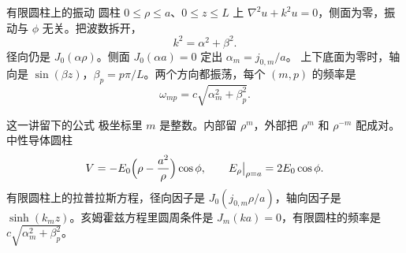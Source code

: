 \documentclass[fontset=windows, chinese, 10pt, xcolor=dvipsnames]{beamer}
\begin{document}
\begin{frame}{有限圆柱上的振动}
  圆柱 $0\leq\rho\leq a$、$0\leq z\leq L$ 上 $\nabla^2 u+k^2 u=0$，侧面为零，振动与 $\phi$ 无关。把波数拆开，
  \[
    k^2=\alpha^2+\beta^2.
  \]
  径向仍是 $J_0(\alpha\rho)$。侧面 $J_0(\alpha a)=0$ 定出 $\alpha_m=j_{0,m}/a$。
  \vspace{0.35em}
  上下底面为零时，轴向是 $\sin(\beta z)$，$\beta_p=p\pi/L$。两个方向都振荡，每个 $(m,p)$ 的频率是
  \[
    \omega_{mp}=c\sqrt{\alpha_m^2+\beta_p^2}.
  \]
\end{frame}

\begin{frame}{这一讲留下的公式}
  极坐标里 $m$ 是整数。内部留 $\rho^{m}$，外部把 $\rho^{m}$ 和 $\rho^{-m}$ 配成对。中性导体圆柱
  \[
    V=-E_0\Bigl(\rho-\frac{a^2}{\rho}\Bigr)\cos\phi,
    \qquad
    E_{\rho}\big|_{\rho=a}=2E_0\cos\phi.
  \]
  有限圆柱上的拉普拉斯方程，径向因子是 $J_0(j_{0,m}\rho/a)$，轴向因子是 $\sinh(k_m z)$。亥姆霍兹方程里圆周条件是 $J_m(ka)=0$，有限圆柱的频率是 $c\sqrt{\alpha_m^2+\beta_p^2}$。
\end{frame}
\end{document}
